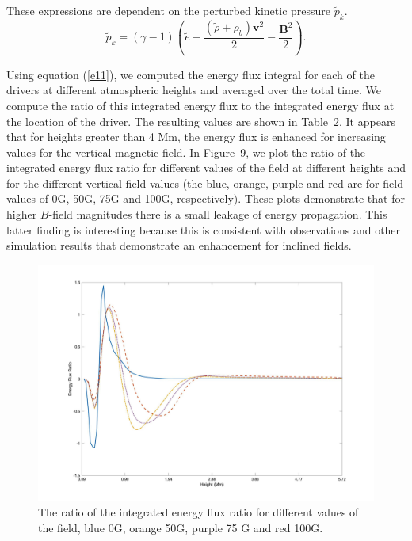 \documentclass[physics,article,submit,pdftex,moreauthors]{Definitions/mdpi}
\begin{document}
These expressions are dependent on the perturbed kinetic pressure $\tilde{p}_{k}$.
$$
\tilde{p}_{k}=\left(\gamma - 1\right)\left( \tilde{e}-\frac{ \left( \tilde{\rho} +\rho_b \right){\mathbf v}^2}{2}-\frac{{\mathbf B}^2}{2}\right).
$$


Using equation (\ref{e11}), we computed the energy flux integral for each of the drivers at different atmospheric heights and averaged over the total time. We compute the ratio of this integrated energy flux to the integrated energy flux at the location of the driver. The resulting values are shown in Table~2. It appears that for heights greater than 4 Mm, the energy flux is enhanced for increasing values for the vertical magnetic field. In Figure~9,
we plot the ratio of the integrated energy flux ratio for different values of the field at different heights and for the different vertical field values (the blue, orange, purple and red  are for field values of 0G, 50G, 75G and 100G, respectively). These plots demonstrate that for higher $B$-field magnitudes there is a small leakage of energy propagation. This latter finding is interesting because this is consistent with observations and other simulation results that demonstrate an enhancement for inclined fields.


\begin{figure}
    \label{energyfluxratio_50G_75G_100G_line}
    \centering
    \includegraphics[scale=0.06]{energyfluxratio.jpg}
    \caption{The ratio of the integrated energy flux ratio for different values of the field, blue 0G, orange 50G, purple 75 G and red 100G.}
\end{figure}
\end{document}
